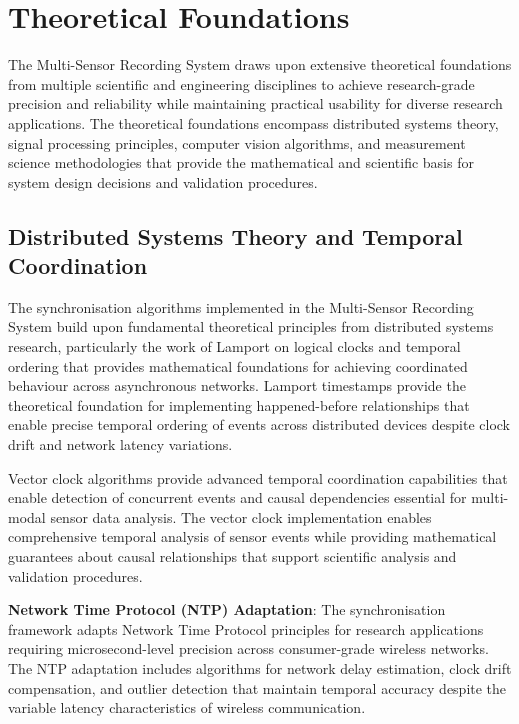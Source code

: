 \documentclass[11pt,a4paper]{report}
\begin{document}
\section{Theoretical Foundations}

The Multi-Sensor Recording System draws upon extensive theoretical foundations from multiple scientific and engineering disciplines to achieve research-grade precision and reliability while maintaining practical usability for diverse research applications. The theoretical foundations encompass distributed systems theory, signal processing principles, computer vision algorithms, and measurement science methodologies that provide the mathematical and scientific basis for system design decisions and validation procedures.

\subsection{Distributed Systems Theory and Temporal Coordination}

The synchronisation algorithms implemented in the Multi-Sensor Recording System build upon fundamental theoretical principles from distributed systems research, particularly the work of Lamport on logical clocks and temporal ordering that provides mathematical foundations for achieving coordinated behaviour across asynchronous networks. Lamport timestamps provide the theoretical foundation for implementing happened-before relationships that enable precise temporal ordering of events across distributed devices despite clock drift and network latency variations.

Vector clock algorithms provide advanced temporal coordination capabilities that enable detection of concurrent events and causal dependencies essential for multi-modal sensor data analysis. The vector clock implementation enables comprehensive temporal analysis of sensor events while providing mathematical guarantees about causal relationships that support scientific analysis and validation procedures.

\noindent \textbf{Network Time Protocol (NTP) Adaptation}: The synchronisation framework adapts Network Time Protocol principles for research applications requiring microsecond-level precision across consumer-grade wireless networks. The NTP adaptation includes algorithms for network delay estimation, clock drift compensation, and outlier detection that maintain temporal accuracy despite the variable latency characteristics of wireless communication.
\end{document}
